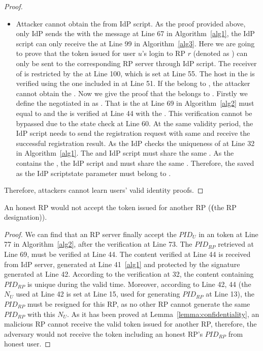 \begin{proof}
\begin{itemize}
\item Attacker cannot obtain the  from IdP script. As the proof provided above, only IdP sends the  with the message at Line 67 in Algorithm~\ref{alg1}, the IdP script can only receive the  at  Line 99 in Algorithm~\ref{alg3}. Here we are going to prove that the token issued for user $u$'s login to RP $r$ (denoted as ) can only be  sent to the corresponding RP server through IdP script. The receiver of  is restricted by the  at Line 100, which is set at Line 55. The host in the  is verified using the one included in  at Line 51. If the  belong to , the attacker cannot obtain the . Now we give the proof that the  belongs to . Firstly we define the negotiated  in  as . That is the  at Line 69 in Algorithm~\ref{alg2}  must equal to  and the  is verified at Line 44 with the . This verification cannot be bypassed due to the state check at Line 60. At the same validity period, the IdP script needs to send the registration request with same   and receive the successful registration result. As the IdP checks the uniqueness of  at  Line 32 in Algorithm~\ref{alg1}. The  and IdP script must share the same . As the  contains the , the IdP script and  must share the same . Therefore, the   saved as the IdP scriptstate parameter must belong to .
\end{itemize}
Therefore, attackers cannot  learn users' valid identity proofs.
\end{proof}


\begin{lemma}
An honest RP would not accept the token issued for another RP (\textbf(the RP designation)).
\label{lemma:RPdesignation}
\end{lemma}
\begin{proof}
We can find that an RP server finally accept the $PID_U$ in an token at Line 77 in Algorithm~\ref{alg2}, after the verification at Line 73. The $PID_{RP}$ retrieved at Line 69, must be verified at Line 44.
The content verified at Line 44 is received from IdP server, generated at Line 41~\ref{alg1} and protected by the signature generated at Line 42.
According to the verification at 32, the content containing $PID_{RP}$ is unique during the valid time.
Moreover, according to Line 42, 44 (the $N_U$ used at Line 42 is set  at  Line 15, used for generating $PID_{RP}$ at Line 13), the $PID_{RP}$ must be resigned for this RP, as no other RP cannot generate the same $PID_{RP}$ with this $N_U$.
As it has been proved at Lemma~\ref{lemma:confidentiality}, an malicious RP cannot receive the valid token issued for another RP, therefore, the adversary would not receive the token including an honest RP's $PID_{RP}$ from honest user.
\end{proof}


